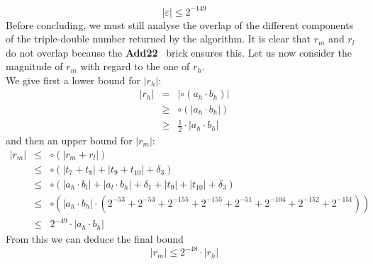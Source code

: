 \documentclass[a4paper,10pt,twoside]{article}
\newenvironment{proof}[1][Proof]{\begin{trivlist}
\item[\hskip \labelsep {\bfseries #1}]}{\end{trivlist}}
\newcommand{\qed}{\nobreak \ifvmode \relax \else \ifdim \lastskip<1.5em \hskip-\lastskip
\hskip1.5em plus0em minus0.5em \fi \nobreak \vrule height0.75em width0.5em depth0.25em\fi}
\newcommand{\hi}{\ensuremath{\mathit{h}}}
\newcommand{\mi}{\ensuremath{\mathit{m}}}
\newcommand{\lo}{\ensuremath{\mathit{l}}}
\newcommand{\AddDD}{{\bf Add22}}
\renewcommand{\epsilon}{\varepsilon}
\begin{document}
\begin{proof}
$$\left \vert \epsilon \right \vert \leq 2^{-149}$$
Before concluding, we must still analyse the overlap of the different components of the triple-double number returned
by the algorithm. It is clear that $r_\mi$ and $r_\lo$ do not overlap because the \AddDD~ brick ensures this. 
Let us now consider the magnitude of $r_\mi$ with regard to the one of $r_\hi$.\\
We give first a lower bound for $\left \vert r_\hi \right \vert$:
\begin{eqnarray*}
\left \vert r_\hi \right \vert & = & \left \vert \circ \left( a_\hi \cdot b_\hi \right) \right \vert \\
& \geq & \circ \left( \left \vert a_\hi \cdot b_\hi \right \vert \right) \\
& \geq & \frac{1}{2} \cdot \left \vert a_\hi \cdot b_\hi \right \vert
\end{eqnarray*}
and then an upper bound for $\left \vert r_\mi \right \vert$:
\begin{eqnarray*}
\left \vert r_\mi \right \vert & \leq & \circ \left( \left \vert r_\mi + r_\lo \right \vert \right) \\
& \leq & \circ \left( \left \vert t_7 + t_8 \right \vert + \left \vert t_9 + t_{10} \right \vert + \delta_3 \right) \\
& \leq & \circ \left( \left \vert a_\hi \cdot b_\lo \right \vert + \left \vert a_\lo \cdot b_\hi \right \vert + \delta_1 +
                      \left \vert t_9 \right \vert + \left \vert t_{10} \right \vert + \delta_3 \right) \\
& \leq & \circ \left( \left \vert a_\hi \cdot b_\hi \right \vert \cdot \left( 
                      2^{-53} + 2^{-53} + 2^{-155} + 2^{-155} + 2^{-51} + 2^{-104} + 2^{-152} + 2^{-151} \right) \right) \\
& \leq & 2^{-49} \cdot \left \vert a_\hi \cdot b_\hi \right \vert
\end{eqnarray*}
From this we can deduce the final bound 
$$\left \vert r_\mi \right \vert \leq 2^{-48} \cdot \left \vert r_\hi \right \vert$$\qed
\end{proof}
\end{document}

